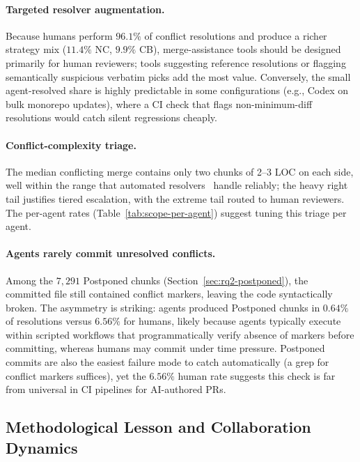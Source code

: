 \documentclass[sigconf,anonymous]{acmart}
\begin{document}
\paragraph{Targeted resolver augmentation.} Because humans perform $96.1\%$ of conflict resolutions and produce a richer strategy mix ($11.4\%$ NC, $9.9\%$ CB), merge-assistance tools should be designed primarily for human reviewers; tools suggesting reference resolutions or flagging semantically suspicious verbatim picks add the most value. Conversely, the small agent-resolved share is highly predictable in some configurations (e.g., Codex on bulk monorepo updates), where a CI check that flags non-minimum-diff resolutions would catch silent regressions cheaply.

\paragraph{Conflict-complexity triage.} The median conflicting merge contains only two chunks of 2--3 LOC on each side, well within the range that automated resolvers~\cite{dinella2022deepmerge,svyatkovskiy2022mergebert,dong2023mergegen, camposjunior2024sbcr} handle reliably; the heavy right tail justifies tiered escalation, with the extreme tail routed to human reviewers. The per-agent rates (Table~\ref{tab:scope-per-agent}) suggest tuning this triage per agent.

\paragraph{Agents rarely commit unresolved conflicts.}\label{sec:disc-postponed} Among the $7{,}291$ Postponed chunks (Section~\ref{sec:rq2-postponed}), the committed file still contained conflict markers, leaving the code syntactically broken. The asymmetry is striking: agents produced Postponed chunks in $0.64\%$ of resolutions versus $6.56\%$ for humans, likely because agents typically execute within scripted workflows that programmatically verify absence of markers before committing, whereas humans may commit under time pressure. Postponed commits are also the easiest failure mode to catch automatically (a grep for conflict markers suffices), yet the $6.56\%$ human rate suggests this check is far from universal in CI pipelines for AI-authored PRs.

\subsection{Methodological Lesson and Collaboration Dynamics}
\label{sec:disc-methodology}
\end{document}
